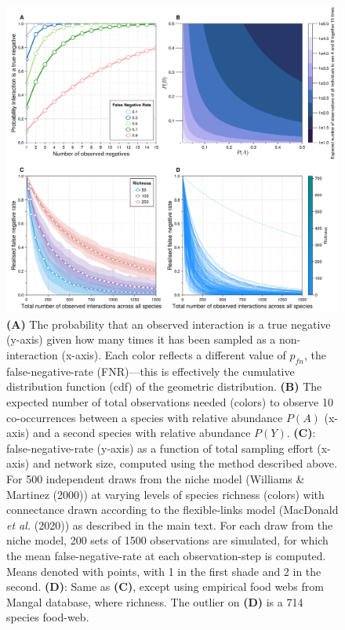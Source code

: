 \documentclass[11pt]{article}
\makeatletter
\def\maxwidth{\ifdim\Gin@nat@width>\linewidth\linewidth
\else\Gin@nat@width\fi}
\let\Oldincludegraphics\includegraphics
\renewcommand{\includegraphics}[1]{\Oldincludegraphics[width=\maxwidth]{#1}}
\makeatother
\begin{document}
\begin{figure}
\hypertarget{fig:geometric}{%
\centering
\includegraphics{./figures/fig1.png}
\caption{\textbf{(A)} The probability that an observed interaction is a
true negative (y-axis) given how many times it has been sampled as a
non-interaction (x-axis). Each color reflects a different value of
\(p_{fn}\), the false-negative-rate (FNR)---this is effectively the
cumulative distribution function (cdf) of the geometric distribution.
\textbf{(B)} The expected number of total observations needed (colors)
to observe 10 co-occurrences between a species with relative abundance
\(P(A)\) (x-axis) and a second species with relative abundance \(P(Y)\).
\textbf{(C)}: false-negative-rate (y-axis) as a function of total
sampling effort (x-axis) and network size, computed using the method
described above. For 500 independent draws from the niche model
(Williams \& Martinez (2000)) at varying levels of species richness
(colors) with connectance drawn according to the flexible-links model
(MacDonald \emph{et al.} (2020)) as described in the main text. For each
draw from the niche model, 200 sets of 1500 observations are simulated,
for which the mean false-negative-rate at each observation-step is
computed. Means denoted with points, with 1 in the first shade and 2 in
the second. \textbf{(D)}: Same as \textbf{(C)}, except using empirical
food webs from Mangal database, where richness. The outlier on
\textbf{(D)} is a 714 species food-web.}\label{fig:geometric}
}
\end{figure}
\end{document}
